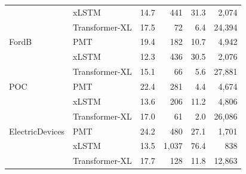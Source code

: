 \begin{table}[tb]
\begin{tabular}{llrrrr}
 & xLSTM & 14.7 & 441 & 31.3 & 2{,}074 \\
 & Transformer-XL & 17.5 & 72 & 6.4 & 24{,}394 \\
\addlinespace
FordB & PMT & 19.4 & 182 & 10.7 & 4{,}942 \\
 & xLSTM & 12.3 & 436 & 30.5 & 2{,}076 \\
 & Transformer-XL & 15.1 & 66 & 5.6 & 27{,}881 \\
\addlinespace
POC & PMT & 22.4 & 281 & 4.4 & 4{,}674 \\
 & xLSTM & 13.6 & 206 & 11.2 & 4{,}806 \\
 & Transformer-XL & 17.0 & 61 & 2.0 & 26{,}086 \\
\addlinespace
ElectricDevices & PMT & 24.2 & 480 & 27.1 & 1{,}701 \\
 & xLSTM & 13.5 & 1{,}037 & 76.4 & 838 \\
 & Transformer-XL & 17.7 & 128 & 11.8 & 12{,}863 \\
\bottomrule
\end{tabular}
\end{table}

